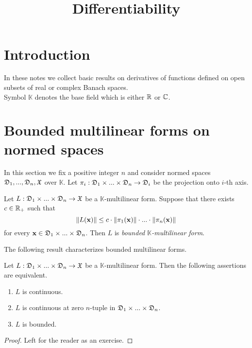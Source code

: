 



\title{Differentiability}
\date{}
\maketitle

\section{Introduction}
\noindent
In these notes we collect basic results on derivatives of functions defined on open subsets of real or complex Banach spaces.\\
Symbol $\mathbb{K}$ denotes the base field which is either ${\mathbb R}$ or ${\mathbb C}$.

\section{Bounded multilinear forms on normed spaces}
\noindent
In this section we fix a positive integer $n$ and consider normed spaces ${\mathfrak D}_1,...,{\mathfrak D}_n, {\mathfrak X}$ over $\mathbb{K}$. Let $\pi_i:{\mathfrak D}_1\times ...\times {\mathfrak D}_n\rightarrow {\mathfrak D}_i$ be the projection onto $i$-th axis.

\begin{definition}
Let $L:{\mathfrak D}_1\times ... \times {\mathfrak D}_n\rightarrow {\mathfrak X}$ be a $\mathbb{K}$-multilinear form. Suppose that there exists $c \in {\mathbb R}_+$ such that
$$\lVert L(\mathbf{x})\rVert \leq c\cdot \lVert\pi_1(\mathbf{x})\rVert\cdot ... \cdot \lVert\pi_n(\mathbf{x})\rVert$$
for every $\mathbf{x} \in {\mathfrak D}_1\times ...\times {\mathfrak D}_n$. Then $L$ is \textit{bounded $\mathbb{K}$-multilinear form}.
\end{definition}
\noindent
The following result characterizes bounded multilinear forms.

\begin{theorem}\label{theorem:characterization_of_bounded_multilinear_maps}
Let $L:{\mathfrak D}_1\times ... \times {\mathfrak D}_n\rightarrow {\mathfrak X}$ be a $\mathbb{K}$-multilinear form. Then the following assertions are equivalent.
\begin{enumerate}[label=\emph{\textbf{(\roman*)}}, leftmargin=*]
\item $L$ is continuous.
\item $L$ is continuous at zero $n$-tuple in ${\mathfrak D}_1\times ... \times {\mathfrak D}_n$.
\item $L$ is bounded.
\end{enumerate}
\end{theorem}
\begin{proof}
Left for the reader as an exercise.
\end{proof}

